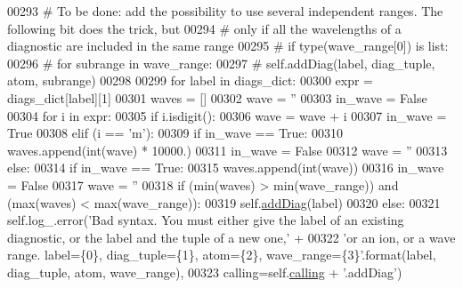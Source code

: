 \begin{DoxyCode}
00293 \textcolor{comment}{# To be done: add the possibility to use several independent ranges. The following bit does the trick, but}
00294 \textcolor{comment}{# only if all the wavelengths of a diagnostic are included in the same range}
00295 \textcolor{comment}{#            if type(wave\_range[0]) is list:}
00296 \textcolor{comment}{#                for subrange in wave\_range:}
00297 \textcolor{comment}{#                    self.addDiag(label, diag\_tuple, atom, subrange)}
00298                  
00299             \textcolor{keywordflow}{for} label \textcolor{keywordflow}{in} diags\_dict:
00300                 expr = diags\_dict[label][1]
00301                 waves = []
00302                 wave = \textcolor{stringliteral}{''}
00303                 in\_wave = \textcolor{keyword}{False}
00304                 \textcolor{keywordflow}{for} i \textcolor{keywordflow}{in} expr:
00305                     \textcolor{keywordflow}{if} i.isdigit():
00306                         wave = wave + i
00307                         in\_wave = \textcolor{keyword}{True}
00308                     \textcolor{keywordflow}{elif} (i == \textcolor{stringliteral}{'m'}):
00309                         \textcolor{keywordflow}{if} in\_wave == \textcolor{keyword}{True}:
00310                             waves.append(int(wave) * 10000.)
00311                             in\_wave = \textcolor{keyword}{False}
00312                             wave = \textcolor{stringliteral}{''}
00313                     \textcolor{keywordflow}{else}:
00314                         \textcolor{keywordflow}{if} in\_wave == \textcolor{keyword}{True}:
00315                             waves.append(int(wave))
00316                             in\_wave = \textcolor{keyword}{False}
00317                             wave = \textcolor{stringliteral}{''}
00318                 \textcolor{keywordflow}{if} (min(waves) > min(wave\_range)) \textcolor{keywordflow}{and} (max(waves) < max(wave\_range)):
00319                     self.\hyperlink{classpyneb_1_1core_1_1diags_1_1_diagnostics_a508fa9c5a2216f9eb4128338c33a6f75}{addDiag}(label)
00320         \textcolor{keywordflow}{else}:
00321             self.log\_.error(\textcolor{stringliteral}{'Bad syntax. You must either give the label of an existing diagnostic, or the
       label and the tuple of a new one,'} + 
00322                             \textcolor{stringliteral}{'or an ion, or a wave range. label=\{0\}, diag\_tuple=\{1\}, atom=\{2\},
       wave\_range=\{3\}'}.format(label, diag\_tuple, atom, wave\_range),
00323                             calling=self.\hyperlink{classpyneb_1_1core_1_1diags_1_1_diagnostics_a07dce673fec8b2383ef411ab94b0b2fe}{calling} + \textcolor{stringliteral}{'.addDiag'})

\end{DoxyCode}
